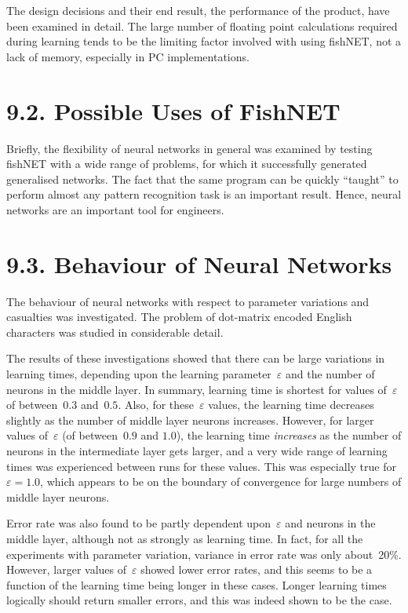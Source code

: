 \documentclass[12pt]{report}
\begin{document}
The design decisions and their end result, the performance of the
product, have been examined in detail.
The large number of floating point calculations required during
learning tends to be the limiting factor involved with using
fishNET, not a lack of memory, especially in PC implementations.

\section{9.2. Possible Uses of FishNET}

Briefly, the flexibility of neural networks in general was examined by
testing fishNET with a wide range of problems, for which it
successfully generated generalised networks.
The fact that the same program can be quickly ``taught'' to perform
almost any pattern recognition task is an important result.
Hence, neural networks are an important tool for engineers.

\section{9.3. Behaviour of Neural Networks}

The behaviour of neural networks with respect to parameter variations and
casualties was investigated.
The problem of dot-matrix encoded English characters was studied in
considerable detail.

The results of these investigations showed that there can be large
variations in learning times, depending upon the learning
parameter~$\varepsilon$ and the number of neurons in the middle
layer.
In summary, learning time is shortest for values of~$\varepsilon$ of
between~$0.3$ and~$0.5$.
Also, for these~$\varepsilon$ values, the learning time decreases
slightly as the number of middle layer neurons increases.
However, for larger values of~$\varepsilon$ (of between~$0.9$ and $1.0$), the
learning time {\sl increases\/} as the number of neurons in the
intermediate layer gets larger, and a very wide range of learning
times was experienced between runs for these values.
This was especially true for~$\varepsilon = 1.0$, which appears to
be on the boundary of convergence for large numbers of middle layer
neurons.

Error rate was also found to be partly dependent upon~$\varepsilon$
and neurons in the middle layer, although not as strongly as learning
time.
In fact, for all the experiments with parameter variation, variance
in error rate was only about~20\%.
However, larger values of~$\varepsilon$ showed lower error rates,
and this seems to be a function of the learning time being longer in
these cases.
Longer learning times logically should return smaller errors, and
this was indeed shown to be the case.
\end{document}
